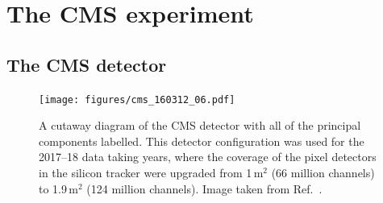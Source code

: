 

\section{The CMS experiment}
\label{sec:detector_cms}




\subsection{The CMS detector}
\label{subsec:cms_detector_itself}


\begin{figure}[htbp]
    \centering
    \texttt{[image: figures/cms\_160312\_06.pdf]}
    \caption[A cutaway diagram of the CMS detector with all of the principal components labelled. This detector configuration was used for the 2017--18 data taking years]{A cutaway diagram of the CMS detector with all of the principal components labelled. This detector configuration was used for the 2017--18 data taking years, where the coverage of the pixel detectors in the silicon tracker were upgraded from 1\,m$^2$ (66 million channels) to 1.9\,m$^2$ (124 million channels). Image taken from Ref.~.}
    \label{fig:detector_cms_cutaway}
\end{figure}

